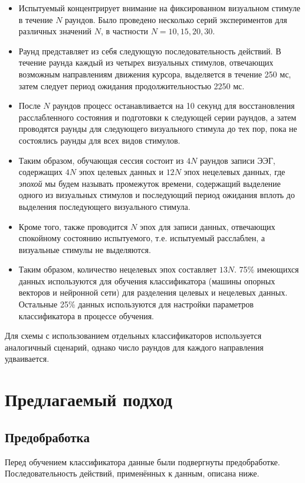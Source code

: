 \documentclass[12pt,a4paper,oneside,fleqn,leqno]{article}
\begin{document}
	\begin{itemize} 
	\item
	Испытуемый концентрирует внимание на фиксированном визуальном стимуле в течение $N$ раундов. Было проведено несколько серий экспериментов для различных значений $N$, в частности $N = 10, 15, 20, 30.$
	\item
	Раунд представляет из себя следующую последовательность действий. В течение раунда каждый из четырех визуальных стимулов, отвечающих возможным направлениям движения курсора, выделяется в течение 250 мс, затем следует период ожидания продолжительностью 2250 мс. 
	\item
	После $N$ раундов процесс останавливается на 10 секунд для восстановления расслабленного состояния и подготовки к следующей серии раундов, а затем проводятся раунды для следующего визуального стимула до тех пор, пока не состоялись раунды для всех видов стимулов.
	\item
	Таким образом, обучающая сессия состоит из $4N$ раундов записи ЭЭГ, содержащих $4N$ эпох целевых данных и $12N$ эпох нецелевых данных, где {\it эпохой} мы будем называть промежуток времени, содержащий выделение одного из визуальных стимулов и последующий период ожидания вплоть до выделения последующего визуального стимула.
	\item
	Кроме того, также проводится $N$ эпох для записи данных, отвечающих спокойному состоянию испытуемого, т.е. испытуемый расслаблен, а визуальные стимулы не выделяются.
	\item
	Таким образом, количество нецелевых эпох составляет $13N$. 75\% имеющихся данных используются для обучения классификатора (машины опорных векторов и нейронной сети) для разделения целевых и нецелевых данных. Остальные 25\% данных используются для настройки параметров классификатора в процессе обучения.
	\end{itemize}
	\par Для схемы с использованием отдельных классификаторов используется аналогичный сценарий, однако число раундов для каждого направления удваивается.

\newpage
\section{Предлагаемый подход}
\subsection{Предобработка}
	\par Перед обучением классификатора данные были подвергнуты предобработке. Последовательность действий, применённых к данным, описана ниже. 
\end{document}
